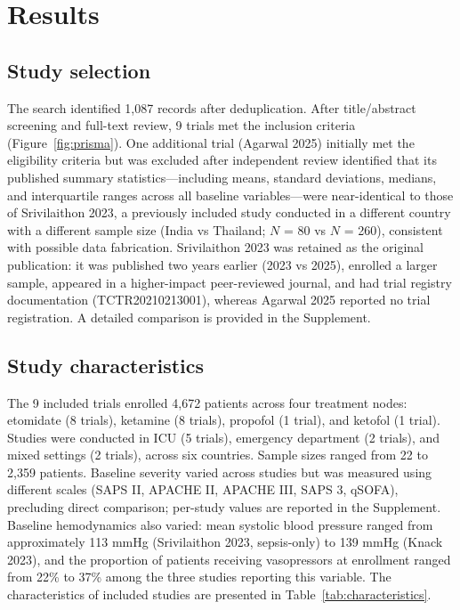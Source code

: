 \documentclass[11pt]{article}
\begin{document}
\section{Results}

\subsection{Study selection}

The search identified 1,087 records after deduplication. After title/abstract screening and full-text review, 9 trials met the inclusion criteria (Figure~\ref{fig:prisma}). One additional trial (Agarwal 2025\cite{agarwal2025}) initially met the eligibility criteria but was excluded after independent review identified that its published summary statistics---including means, standard deviations, medians, and interquartile ranges across all baseline variables---were near-identical to those of Srivilaithon 2023,\cite{srivilaithon2023} a previously included study conducted in a different country with a different sample size (India vs Thailand; $N$ = 80 vs $N$ = 260), consistent with possible data fabrication. Srivilaithon 2023 was retained as the original publication: it was published two years earlier (2023 vs 2025), enrolled a larger sample, appeared in a higher-impact peer-reviewed journal, and had trial registry documentation (TCTR20210213001), whereas Agarwal 2025 reported no trial registration. A detailed comparison is provided in the Supplement.

\subsection{Study characteristics}

The 9 included trials\cite{jabre2009,cinar2011,punt2014,smischney2019,matchett2022,knack2023,srivilaithon2023,casey2025,schmidt2025} enrolled 4,672 patients across four treatment nodes: etomidate (8 trials), ketamine (8 trials), propofol (1 trial), and ketofol (1 trial). Studies were conducted in ICU (5 trials), emergency department (2 trials), and mixed settings (2 trials), across six countries. Sample sizes ranged from 22 to 2,359 patients. Baseline severity varied across studies but was measured using different scales (SAPS II, APACHE II, APACHE III, SAPS 3, qSOFA), precluding direct comparison; per-study values are reported in the Supplement. Baseline hemodynamics also varied: mean systolic blood pressure ranged from approximately 113 mmHg (Srivilaithon 2023, sepsis-only) to 139 mmHg (Knack 2023), and the proportion of patients receiving vasopressors at enrollment ranged from 22\% to 37\% among the three studies reporting this variable. The characteristics of included studies are presented in Table~\ref{tab:characteristics}.
\end{document}
